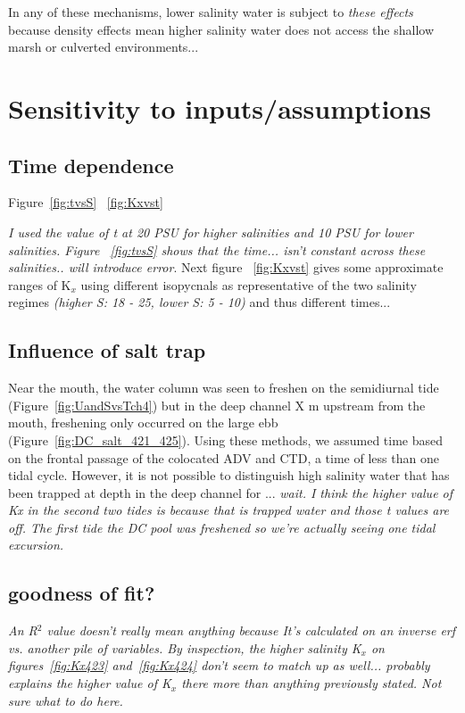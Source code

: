 In any of these mechanisms, lower salinity water is subject to \emph{these effects} because density effects mean higher salinity water does not access the shallow marsh or culverted environments... 



\section{Sensitivity to inputs/assumptions} \label{sec:Sensitivity}

\subsection{Time dependence}

Figure~\ref{fig:tvsS} ~\ref{fig:Kxvst}

\emph{I used the value of t at 20 PSU for higher salinities and 10 PSU for lower salinities.  Figure ~\ref{fig:tvsS} shows that the time... isn't constant across these salinities.. will introduce error}.  Next figure ~\ref{fig:Kxvst} gives some approximate ranges of K$_x$ using different isopycnals as representative of the two salinity regimes \emph{(higher S: 18 - 25, lower S: 5 - 10)} and thus different times... 


\subsection{Influence of salt trap}
Near the mouth, the water column was seen to freshen on the semidiurnal tide (Figure~\ref{fig:UandSvsTch4}) but in the deep channel X m upstream from the mouth, freshening only occurred on the large ebb (Figure~\ref{fig:DC_salt_421_425}). Using these methods, we assumed time based on the frontal passage of the colocated ADV and CTD, a time of less than one tidal cycle. However, it is not possible to distinguish high salinity water that has been trapped at depth in the deep channel for ... \emph{wait. I think the higher value of Kx in the second two tides is because that is trapped water and those t values are off. The first tide the DC pool was freshened so we're actually seeing one tidal excursion.}

\subsection{goodness of fit?}
\emph{An R$^2$ value doesn't really mean anything because It's calculated on an inverse erf vs. another pile of variables. By inspection, the higher salinity K$_x$ on figures~\ref{fig:Kx423} and~\ref{fig:Kx424} don't seem to match up as well... probably explains the higher value of K$_x$ there more than anything previously stated. Not sure what to do here.}

